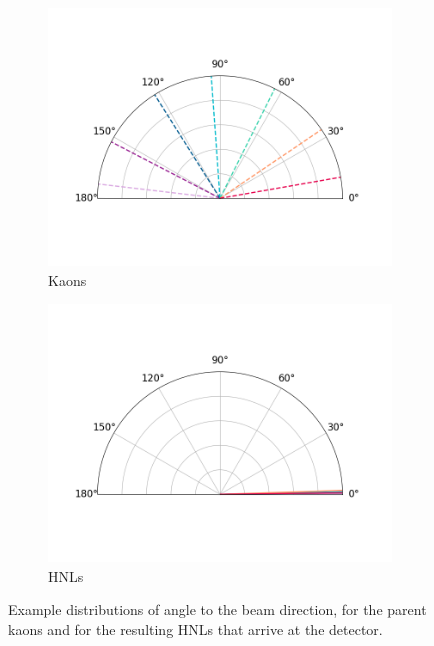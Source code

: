 \begin{figure}[htbp!]
        \centering
        \begin{subfigure}[b]{0.495\textwidth}
            \centering
            \includegraphics[width=\textwidth]{kaon_angle}
            \caption{Kaons}%
            \label{fig:kaon_angle2beam}
        \end{subfigure}
        \hfill
        \begin{subfigure}[b]{0.495\textwidth}  
            \centering 
            \includegraphics[width=\textwidth]{hnl_angle}
            \caption{HNLs}%
            \label{fig:hnl_angle2beam}
        \end{subfigure}
        \caption[kaon_hnl_angle2beam]{Example distributions of angle to the beam direction, for the parent kaons and for the resulting HNLs that arrive at the detector.}
        \label{fig:kaon_hnl_angle2beam}
\end{figure}

